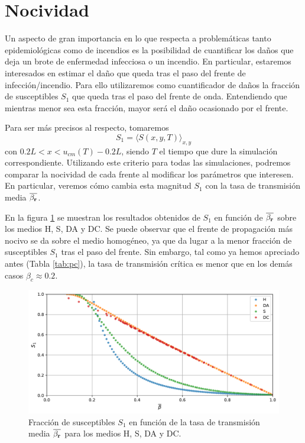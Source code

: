 \section{Nocividad}

Un aspecto de gran importancia en lo que respecta a problemáticas tanto epidemiológicas como de incendios es la posibilidad de cuantificar los daños que
deja un brote de enfermedad infecciosa o un incendio. En particular, estaremos interesados en estimar el daño que queda tras el paso del frente de infección/incendio. 
Para ello utilizaremos como cuantificador de daños la fracción de susceptibles $S_1$ que queda tras el paso del frente de onda. Entendiendo que mientras menor sea esta 
fracción, mayor será el daño ocasionado por el frente.

Para ser más precisos al respecto, tomaremos 
\[S_1=\langle S(x,y,T)\rangle_{x,y}\]
con $0.2L<x<u_{cm}(T)-0.2L$, siendo $T$ el tiempo que dure la simulación correspondiente. Utilizando este criterio para todas las simulaciones, podremos comparar 
la nocividad de cada frente al modificar los parámetros que interesen. En particular, veremos cómo cambia esta magnitud $S_1$ con la tasa de transmisión media 
$\overline{\beta_{\vb r}}$.

En la figura \ref{fig:S_1} se muestran los resultados obtenidos de $S_1$ en función de $\overline{\beta_{\vb r}}$ sobre los medios H, S, DA y DC. Se puede 
observar que el frente de propagación más nocivo se da sobre el medio homogéneo, ya que da lugar a la menor fracción de susceptibles $S_1$ tras el paso del frente. Sin 
embargo, tal como ya hemos apreciado antes (Tabla \ref{tab:pc}), la tasa de transmisión crítica es menor que en los demás casos $\beta_c\approx0.2$.

\begin{figure}[h]
    \centering
    \includegraphics[width=\imsizeL]{S_1.pdf}
    \caption{Fracción de susceptibles $S_1$ en función de la tasa de transmisión media $\overline{\beta_{\vb r}}$ para los medios H, S, DA y DC.}
    \label{fig:S_1}
\end{figure}

